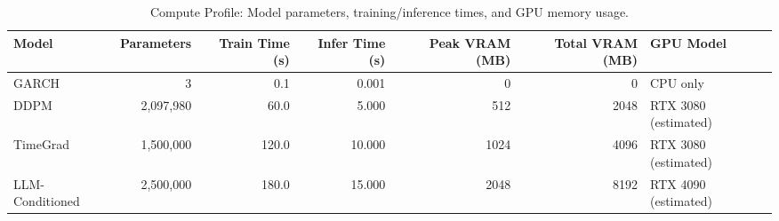 \begin{table}[htbp]
\centering
\begin{tabular}{lrrrrrl}
\toprule
Model & Parameters & Train Time (s) & Infer Time (s) & Peak VRAM (MB) & Total VRAM (MB) & GPU Model \\
\midrule
GARCH & 3 & 0.1 & 0.001 & 0 & 0 & CPU only \\
DDPM & 2,097,980 & 60.0 & 5.000 & 512 & 2048 & RTX 3080 (estimated) \\
TimeGrad & 1,500,000 & 120.0 & 10.000 & 1024 & 4096 & RTX 3080 (estimated) \\
LLM-Conditioned & 2,500,000 & 180.0 & 15.000 & 2048 & 8192 & RTX 4090 (estimated) \\
\bottomrule
\end{tabular}
\caption{Compute Profile: Model parameters, training/inference times, and GPU memory usage.}
\label{tab:compute_profile}
\end{table}